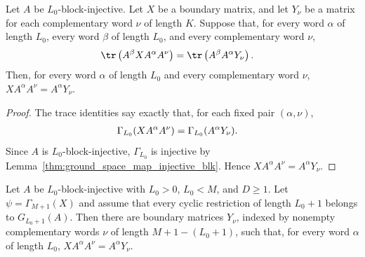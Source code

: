 \begin{lemma}
    \label{thm:block_window_matrix_equation_trace_word_products}
    \leanok
    Let $A$ be $L_0$-block-injective. Let $X$ be a boundary matrix, and let
    $Y_\nu$ be a matrix for each complementary word $\nu$ of length $K$.
    Suppose that, for every word $\alpha$ of length $L_0$, every word $\beta$
    of length $L_0$, and every complementary word $\nu$,
    \begin{align}
        \tr\left(A^\beta X A^\alpha A^\nu\right)
         & = \tr\left(A^\beta A^\alpha Y_\nu\right).
        \notag
    \end{align}
    Then, for every word $\alpha$ of length $L_0$ and every complementary word
    $\nu$,
    $X A^\alpha A^\nu = A^\alpha Y_\nu$.
\end{lemma}

\begin{proof}
    \leanok
    The trace identities say exactly that, for each fixed pair
    $(\alpha,\nu)$,
    \begin{align}
        \Gamma_{L_0}(X A^\alpha A^\nu)
         & = \Gamma_{L_0}(A^\alpha Y_\nu).
        \notag
    \end{align}
    Since $A$ is $L_0$-block-injective, $\Gamma_{L_0}$ is injective by
    Lemma~\ref{thm:ground_space_map_injective_blk}. Hence
    $X A^\alpha A^\nu=A^\alpha Y_\nu$.
\end{proof}

\begin{lemma}[Matrix identity $X A^\alpha A^\nu=A^\alpha Y_\nu$ from cyclic-window constraints]
    \label{lem:closure_property_boundary_block_window_equation_ground_space_map}
    \leanok
    Let $A$ be $L_0$-block-injective with $L_0>0$, $L_0<M$, and
    $D\ge1$. Let $\psi=\Gamma_{M+1}(X)$ and assume that every cyclic
    restriction of length $L_0+1$ belongs to $G_{L_0+1}(A)$. Then there are
    boundary matrices $Y_\nu$, indexed by nonempty complementary words $\nu$
    of length $M+1-(L_0+1)$, such that, for every word $\alpha$ of length
    $L_0$,
    $X A^\alpha A^\nu = A^\alpha Y_\nu$.
\end{lemma}


